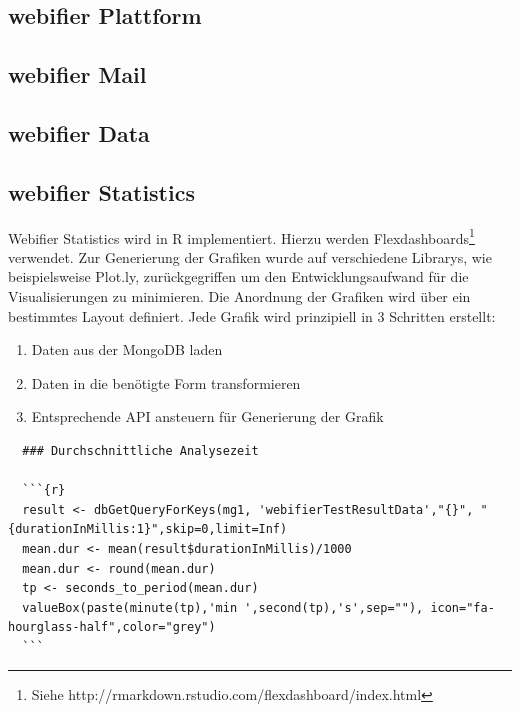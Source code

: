 
\subsection{webifier Plattform}


\subsection{webifier Mail}


\subsection{webifier Data}


\subsection{webifier Statistics}
Webifier Statistics wird in R implementiert. Hierzu werden Flexdashboards\footnote{Siehe http://rmarkdown.rstudio.com/flexdashboard/index.html} verwendet. Zur Generierung der Grafiken wurde auf verschiedene Librarys, wie beispielsweise Plot.ly, zurückgegriffen um den Entwicklungsaufwand für die Visualisierungen zu minimieren. Die Anordnung der Grafiken wird über ein bestimmtes Layout definiert. Jede Grafik wird prinzipiell in 3 Schritten erstellt:

\begin{enumerate}
  \item Daten aus der MongoDB laden
  \item Daten in die benötigte Form transformieren
  \item Entsprechende API ansteuern für Generierung der Grafik
\end{enumerate}

\begin{scriptsize}
\begin{lstlisting}
  ### Durchschnittliche Analysezeit

  ```{r}
  result <- dbGetQueryForKeys(mg1, 'webifierTestResultData',"{}", "{durationInMillis:1}",skip=0,limit=Inf)
  mean.dur <- mean(result$durationInMillis)/1000
  mean.dur <- round(mean.dur)
  tp <- seconds_to_period(mean.dur)
  valueBox(paste(minute(tp),'min ',second(tp),'s',sep=""), icon="fa-hourglass-half",color="grey")
  ```
\end{lstlisting}
\end{scriptsize}

